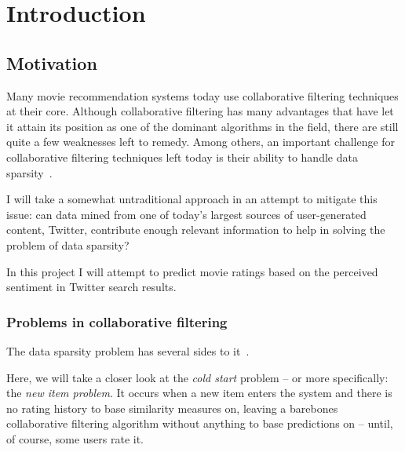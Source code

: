 
\chapter{Introduction} %

\label{Chapter1} %




\section{Motivation}
\label{sec:motivation}

Many movie recommendation systems today use collaborative filtering techniques at their core. Although collaborative filtering has many advantages that have let it attain its position as one of the dominant algorithms in the field, there are still quite a few weaknesses left to remedy. Among others, an important challenge for collaborative filtering techniques left today is their ability to handle data sparsity~\cite{Su:2009:SCF:1592474.1722966}.

I will take a somewhat untraditional approach in an attempt to mitigate this issue: can data mined from one of today's largest sources of user-generated content, Twitter, contribute enough relevant information to help in solving the problem of data sparsity?

In this project I will attempt to predict movie ratings based on the perceived sentiment in Twitter search results.

\subsection{Problems in collaborative filtering}

The data sparsity problem has several sides to it~\cite{Su:2009:SCF:1592474.1722966}.

Here, we will take a closer look at the \emph{cold start} problem -- or more specifically: the \emph{new item problem}. It occurs when a new item enters the system and there is no rating history to base similarity measures on, leaving a barebones collaborative filtering algorithm without anything to base predictions on -- until, of course, some users rate it.

